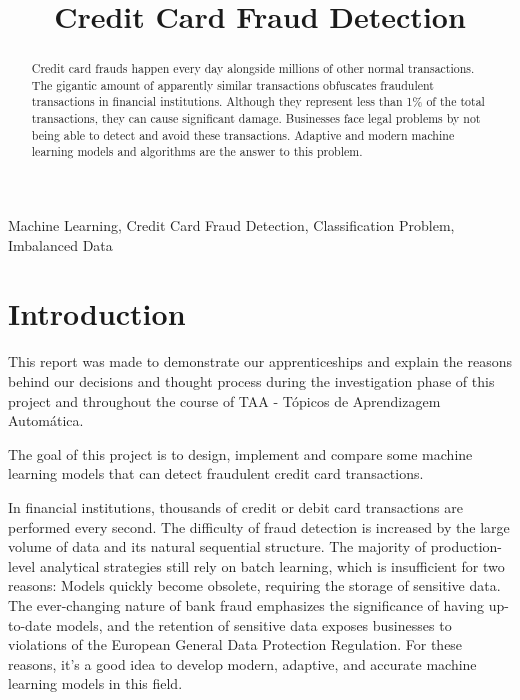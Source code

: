 \documentclass[conference]{IEEEtran}
\begin{document}
\title{Credit Card Fraud Detection\\}

\author{
\and
{}
}

\maketitle

\begin{abstract}
Credit card frauds happen every day alongside millions of other normal transactions. The gigantic amount of apparently similar transactions obfuscates fraudulent transactions in financial institutions. Although they represent less than 1\% of the total transactions, they can cause significant damage. Businesses face legal problems by not being able to detect and avoid these transactions. Adaptive and modern machine learning models and algorithms are the answer to this problem.
\end{abstract}
\begin{IEEEkeywords}
Machine Learning, Credit Card Fraud Detection, Classification Problem, Imbalanced Data
\end{IEEEkeywords}


\section{Introduction}
This report was made to demonstrate our apprenticeships and explain the reasons behind our decisions and thought process during the investigation phase of this project and throughout the course of TAA - Tópicos de Aprendizagem Automática.

The goal of this project is to design, implement and compare some machine learning models that can detect fraudulent credit card transactions.

In financial institutions, thousands of credit or debit card transactions are performed every second. The difficulty of fraud detection is increased by the large volume of data and its natural sequential structure. The majority of production-level analytical strategies still rely on batch learning, which is insufficient for two reasons: Models quickly become obsolete, requiring the storage of sensitive data. The ever-changing nature of bank fraud emphasizes the significance of having up-to-date models, and the retention of sensitive data exposes businesses to violations of the European General Data Protection Regulation. For these reasons, it's a good idea to develop modern, adaptive, and accurate machine learning models in this field.
\end{document}
